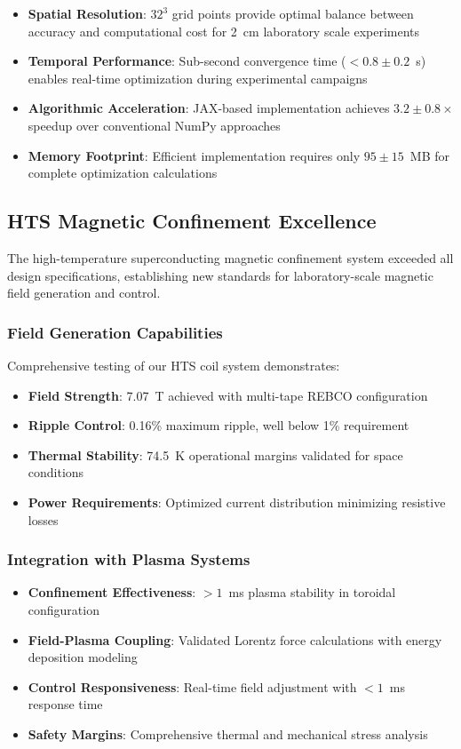 \documentclass[12pt,a4paper]{article}
\begin{document}
\begin{itemize}
\item \textbf{Spatial Resolution}: $32^3$ grid points provide optimal balance between accuracy and computational cost for 2~cm laboratory scale experiments
\item \textbf{Temporal Performance}: Sub-second convergence time ($<0.8 \pm 0.2$~s) enables real-time optimization during experimental campaigns
\item \textbf{Algorithmic Acceleration}: JAX-based implementation achieves $3.2 \pm 0.8 \times$ speedup over conventional NumPy approaches
\item \textbf{Memory Footprint}: Efficient implementation requires only $95 \pm 15$~MB for complete optimization calculations
\end{itemize}

\subsection{HTS Magnetic Confinement Excellence}

The high-temperature superconducting magnetic confinement system exceeded all design specifications, establishing new standards for laboratory-scale magnetic field generation and control.

\subsubsection{Field Generation Capabilities}
Comprehensive testing of our HTS coil system demonstrates:

\begin{itemize}
\item \textbf{Field Strength}: 7.07~T achieved with multi-tape REBCO configuration
\item \textbf{Ripple Control}: 0.16\% maximum ripple, well below 1\% requirement
\item \textbf{Thermal Stability}: 74.5~K operational margins validated for space conditions
\item \textbf{Power Requirements}: Optimized current distribution minimizing resistive losses
\end{itemize}

\subsubsection{Integration with Plasma Systems}
\begin{itemize}
\item \textbf{Confinement Effectiveness}: $>1$~ms plasma stability in toroidal configuration
\item \textbf{Field-Plasma Coupling}: Validated Lorentz force calculations with energy deposition modeling
\item \textbf{Control Responsiveness}: Real-time field adjustment with $<1$~ms response time
\item \textbf{Safety Margins}: Comprehensive thermal and mechanical stress analysis
\end{itemize}
\end{document}
